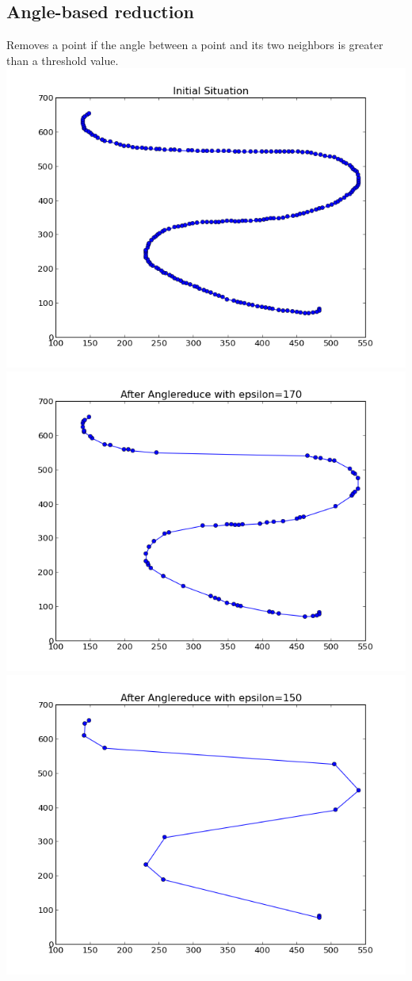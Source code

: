 \documentclass[twoside]{scrartcl}
\begin{document}
\subsection{Angle-based reduction}
Removes a point if the angle between a point and its two neighbors
is greater than a threshold value.\\
\includegraphics[scale=0.48]{simp-1.png}
\includegraphics[scale=0.48]{simp-2.png}
\includegraphics[scale=0.48]{simp-3.png}\\
\end{document}
